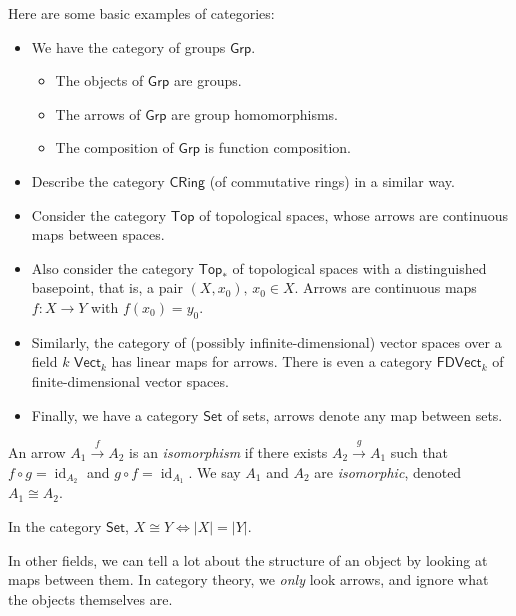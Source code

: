 \begin{example}
    Here are some basic examples of categories:
    \begin{itemize}
        \item We have the category of groups $\mathsf{Grp}.$ 
            \begin{itemize}
                \item The objects of $\mathsf{Grp}$ are groups.
                \item The arrows of $\mathsf{Grp}$ are group homomorphisms.
                \item The composition of $\mathsf{Grp}$ is function composition.
            \end{itemize}
        \item Describe the category $\mathsf{CRing}$ (of commutative rings) in a similar way.
        \item Consider the category $\mathsf{Top}$ of topological spaces, whose arrows are continuous maps between spaces.
        \item Also consider the category $\mathsf{Top}_{*}$ of topological spaces with a distinguished basepoint, that is, a pair $(X,x_0), \, x_0\in X$. Arrows are continuous maps $f \colon X \to Y$ with $f(x_0)=y_0$.
        \item Similarly, the category of (possibly infinite-dimensional) vector spaces over a field $k$ $\mathsf{Vect}_{k}$ has linear maps for arrows. There is even a category $\mathsf{FDVect}_{k}$ of finite-dimensional vector spaces.
        \item Finally, we have a category $\mathsf{Set}$ of sets, arrows denote any map between sets.
    \end{itemize}
\end{example}
\begin{definition}[Isomorphism]
    An arrow $A_1\overset{f}{\to }A_2$ is an \emph{isomorphism} if there exists $A_2\overset{g}{\to }A_1$ such that $f\circ g=\operatorname{id}_{A_2}$ and $g\circ f=\operatorname{id}_{A_1}$. We say $A_1$ and $A_2$ are \emph{isomorphic}, denoted $A_1\cong A_2$.
\end{definition}
\begin{remark}
    In the category $\mathsf{Set}$, $X\cong Y \iff |X|=|Y|$.
\end{remark}
In other fields, we can tell a lot about the structure of an object by looking at maps between them. In category theory, we \emph{only} look arrows, and ignore what the objects themselves are.
